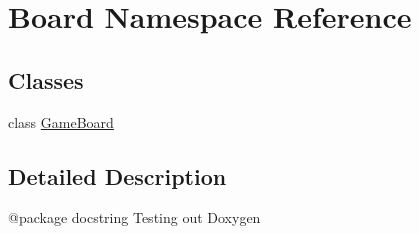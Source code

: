 \hypertarget{namespace_board}{}\section{Board Namespace Reference}
\label{namespace_board}
\subsection*{Classes}
\begin{DoxyCompactItemize}
\item 
class \hyperlink{class_board_1_1_game_board}{Game\+Board}
\end{DoxyCompactItemize}


\subsection{Detailed Description}
\begin{DoxyVerb}@package docstring
Testing out Doxygen
\end{DoxyVerb}
 